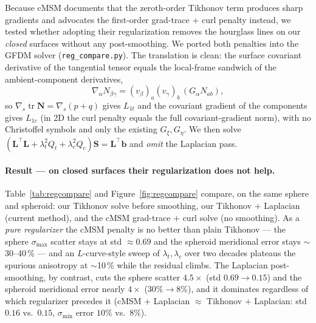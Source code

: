 \documentclass[11pt]{article}
\newcommand{\vv}[1]{\bm{#1}}
\newcommand{\NN}{\mathbf{N}}
\begin{document}
Because cMSM documents that the zeroth-order Tikhonov term produces sharp gradients and
advocates the first-order grad-trace $+$ curl penalty instead, we tested whether adopting
their regularization removes the hourglass lines on our \emph{closed} surfaces without any
post-smoothing. We ported both penalties into the GFDM solver (\texttt{reg\_compare.py}). The
translation is clean: the surface covariant derivative of the tangential tensor equals the
local-frame sandwich of the ambient-component derivatives,
\begin{equation}
  \nabla_\alpha N_{\beta\gamma}=(v_\beta)_a(v_\gamma)_b\,(G_\alpha N_{ab}),
\end{equation}
so $\nabla_s\!\operatorname{tr}\NN=\nabla_s(p+q)$ gives $L_{1t}$ and the covariant gradient of
the components gives $L_{1c}$ (in 2D the curl penalty equals the full covariant-gradient norm),
with no Christoffel symbols and only the existing $G_\xi,G_\eta$. We then solve
$(\mathbf L^{\!\top}\mathbf L+\lambda_t^2 Q_t+\lambda_c^2 Q_c)\vv S=\mathbf L^{\!\top}\vv b$ and
\emph{omit} the Laplacian pass.

\paragraph{Result --- on closed surfaces their regularization does not help.}
Table~\ref{tab:regcompare} and Figure~\ref{fig:regcompare} compare, on the same sphere and
spheroid: our Tikhonov solve before smoothing, our Tikhonov $+$ Laplacian (current method), and
the cMSM grad-trace $+$ curl solve (no smoothing). As a \emph{pure regularizer} the cMSM penalty
is no better than plain Tikhonov --- the sphere $\sigma_{\max}$ scatter stays at std $\approx0.69$
and the spheroid meridional error stays $\sim$30--40\,\% --- and an $L$-curve-style sweep of
$\lambda_t,\lambda_c$ over two decades plateaus the spurious anisotropy at $\sim$10\,\% while the
residual climbs. The Laplacian post-smoothing, by contrast, cuts the sphere scatter
$4.5\times$ (std $0.69\to0.15$) and the spheroid meridional error nearly $4\times$
($30\%\to8\%$), and it dominates regardless of which regularizer precedes it
(cMSM $+$ Laplacian $\approx$ Tikhonov $+$ Laplacian: std $0.16$ vs.\ $0.15$, $\sigma_{\min}$
error $10\%$ vs.\ $8\%$).
\end{document}

